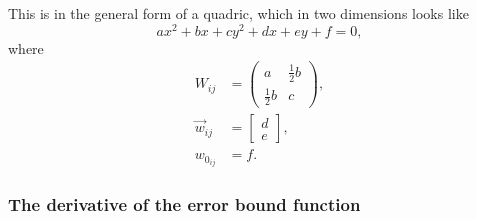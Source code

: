 \documentclass[headings=optiontoheadandtoc,listof=totoc,parskip=full]{scrartcl}
\begin{document}
This is in the general form of a quadric, which in two dimensions looks like
\[
	ax^2 + bx + cy^2 + dx + ey + f = 0,
\]
where
\begin{align}
	W_{ij} &= \begin{pmatrix}a & \frac{1}{2}b\\\frac{1}{2}b & c\end{pmatrix}, \label{eq:quadric-params-quadratic}\\
	\vec w_{ij} &= \begin{bmatrix}d\\e\end{bmatrix}, \label{eq:quadric-params-linear}\\
	w_{0_{ij}} &= f. \label{eq:quadric-params-constant}
\end{align}

\subsubsection{The derivative of the error bound function}
\end{document}
